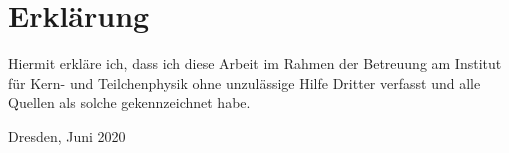 \thispagestyle{empty}
\section*{Erklärung}

Hiermit erkläre ich, dass ich diese Arbeit im Rahmen der Betreuung am
Institut für Kern- und Teilchenphysik ohne unzulässige Hilfe Dritter
verfasst und alle Quellen als solche gekennzeichnet habe.

\vfill

{
  \makeatletter
  \@author
  \makeatother
}

Dresden, Juni 2020

